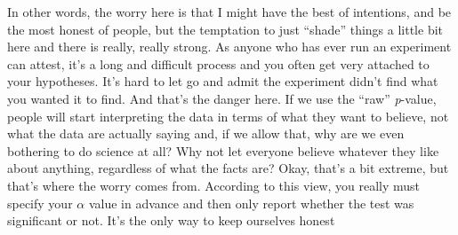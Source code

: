 \documentclass[
  a4paper,
]{book}
\begin{document}
In other words, the worry here is that I might have the best of
intentions, and be the most honest of people, but the temptation to just
``shade'' things a little bit here and there is really, really strong.
As anyone who has ever run an experiment can attest, it's a long and
difficult process and you often get very attached to your hypotheses.
It's hard to let go and admit the experiment didn't find what you wanted
it to find. And that's the danger here. If we use the ``raw''
\emph{p}-value, people will start interpreting the data in terms of what
they want to believe, not what the data are actually saying and, if we
allow that, why are we even bothering to do science at all? Why not let
everyone believe whatever they like about anything, regardless of what
the facts are? Okay, that's a bit extreme, but that's where the worry
comes from. According to this view, you really must specify your
\(\alpha\) value in advance and then only report whether the test was
significant or not. It's the only way to keep ourselves honest

\hypertarget{tbl-tab9-5}{}
 
  \providecommand{\huxb}[2]{\arrayrulecolor[RGB]{#1}\global\arrayrulewidth=#2pt}
  \providecommand{\huxvb}[2]{\color[RGB]{#1}\vrule width #2pt}
  \providecommand{\huxtpad}[1]{\rule{0pt}{#1}}
  \providecommand{\huxbpad}[1]{\rule[-#1]{0pt}{#1}}
\end{document}
